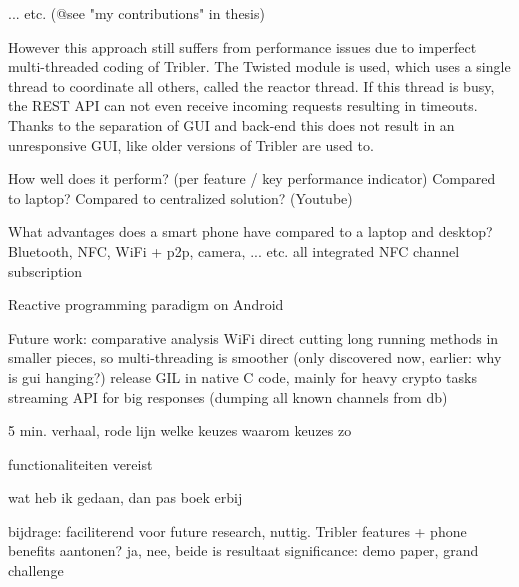 ... etc. (@see "my contributions" in thesis)

However this approach still suffers from performance issues due to imperfect multi-threaded coding of Tribler.
The Twisted module is used, which uses a single thread to coordinate all others, called the reactor thread.
If this thread is busy, the REST API can not even receive incoming requests resulting in timeouts.
Thanks to the separation of GUI and back-end this does not result in an unresponsive GUI, like older versions of Tribler are used to.


How well does it perform? (per feature / key performance indicator)
Compared to laptop?
Compared to centralized solution? (Youtube)

What advantages does a smart phone have compared to a laptop and desktop?
Bluetooth, NFC, WiFi + p2p, camera, ... etc. all integrated
NFC channel subscription

Reactive programming paradigm on Android

Future work:
comparative analysis
WiFi direct
cutting long running methods in smaller pieces, so multi-threading is smoother (only discovered now, earlier: why is gui hanging?)
release GIL in native C code, mainly for heavy crypto tasks
streaming API for big responses (dumping all known channels from db)



5 min. verhaal, rode lijn
welke keuzes
waarom keuzes zo

functionaliteiten vereist


wat heb ik gedaan, dan pas boek erbij


bijdrage: faciliterend voor future research, nuttig. Tribler features + phone benefits
aantonen? ja, nee, beide is resultaat
significance: demo paper, grand challenge


